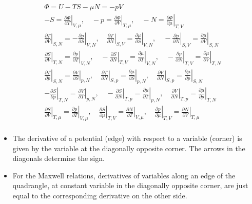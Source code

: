 \documentclass[10pt]{article}
\newcommand{\pder}[2]{\frac{\partial #1}{\partial #2}}
\newcommand{\evalb}[1]{\left. #1 \right|}
\begin{document}
\begin{multicols}{2}
\begin{align*}
		& \Phi = U -TS - \mu N = -pV	\tag*{Defintion of the grand potential (GNS 4.111,4.115)} \\
		& -S = \evalb{\pder{\Phi}{T}}_{V,\mu}, \quad -p = \evalb{\pder{\Phi}{V}}_{T,\mu}, \quad -N = \evalb{\pder{\Phi}{\mu}}_{T,V}	\tag*{State quantities from grand potential (GNS 4.113)} \\
		& \evalb{\pder{T}{V}}_{S,N} = - \evalb{\pder{p}{S}}_{V,N}, \quad \evalb{\pder{T}{N}}_{S,V} = \evalb{\pder{\mu}{S}}_{V,N}, \quad -\evalb{\pder{p}{N}}_{S,V} = \evalb{\pder{\mu}{V}}_{S,N}	\tag*{Maxwell relations following from potential energy (GNS 4.127)} \\
		& \evalb{\pder{S}{V}}_{T,N} = \evalb{\pder{p}{T}}_{V,N}, \quad -\evalb{\pder{S}{N}}_{T,V} = \evalb{\pder{\mu}{T}}_{V,N}, \quad -\evalb{\pder{p}{N}}_{T,V} = \evalb{\pder{\mu}{V}}_{T,N} \tag*{Maxwell relations following from the free energy (GNS 4.129)} \\
		& \evalb{\pder{T}{p}}_{S,N} = \evalb{\pder{V}{S}}_{p,N}, \quad \evalb{\pder{T}{N}}_{S,p} = \evalb{\pder{\mu}{S}}_{p,N}, \quad \evalb{\pder{V}{N}}_{S,p} = \evalb{\pder{\mu}{p}}_{S,N}	\tag*{Maxwell relations following from the enthalpy (GNS 4.131)} \\
		& -\evalb{\pder{S}{p}}_{T,N} = \evalb{\pder{V}{T}}_{p,N}, \quad -\evalb{\pder{S}{N}}_{T,p} = \evalb{\pder{\mu}{T}}_{p,N}, \quad \evalb{\pder{V}{N}}_{T,p} = \evalb{\pder{\mu}{p}}_{T,N} 	\tag*{Maxwell relations following from the free enthalpy (GNS 4.133)} \\
		& \evalb{\pder{S}{V}}_{T,\mu}=\evalb{\pder{p}{T}}_{V,\mu}, \quad \evalb{\pder{S}{\mu}}_{T,V} = \evalb{\pder{N}{T}}_{V,\mu}, \quad \evalb{\pder{p}{\mu}}_{T,V} = \evalb{\pder{N}{V}}_{T,\mu}		\tag*{Maxwell relations following from the grand potential (GNS 4.135)} \\
	\end{align*}
	
	\begin{minipage}{0.3 \columnwidth}
		
	\end{minipage}
	\begin{minipage}{0.65 \columnwidth}
		\begin{itemize}
			\item The derivative of a potential (edge) with respect to a variable (corner) is given by the variable at the diagonally opposite corner. The arrows in the diagonals determine the sign. \\
			\item For the Maxwell relations, derivatives of variables along an edge of the quadrangle, at constant variable in the diagonally opposite corner, are just equal to the corresponding derivative on the other side.
		\end{itemize}
	\end{minipage}
	

\end{multicols}
\end{document}
